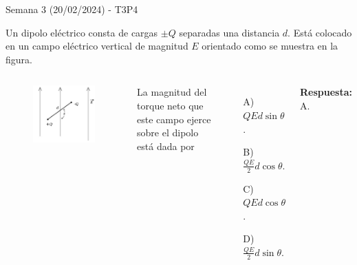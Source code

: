 \begin{frame}{Semana 3 (20/02/2024) - T3P4}

    Un dipolo eléctrico consta de cargas $\pm Q$ separadas una distancia $d$. Está colocado en un campo eléctrico vertical de magnitud $E$ orientado como se muestra en la figura.
    
    \begin{columns}
    
    \begin{figure}
        \centering
        \includegraphics[scale=0.35]{figures/t3p4.png}
    \end{figure}
    
    
    La magnitud del torque neto que este campo ejerce sobre el dipolo est\'a dada por
    
    \begin{itemize}
        \item[A)] $QEd\sin\theta$.
        \item[B)] $\frac{QE}{2}d\cos\theta$.
        \item[C)] $QEd\cos\theta$.
        \item[D)] $\frac{QE}{2}d\sin\theta$.
    \end{itemize}
    
    \pause\bigskip\centering\textbf{Respuesta:} A.
    
    \end{columns}
    
\end{frame}

